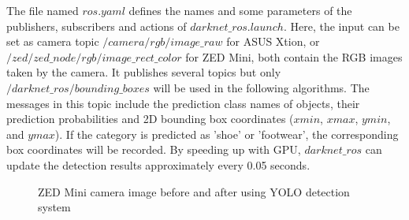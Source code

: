 The file named $ros.yaml$ defines the names and some parameters of the publishers, subscribers and actions of $darknet\_ros.launch$. Here, the input can be set as camera topic $/camera/rgb/image\_raw$ for ASUS Xtion, or $/zed\slash zed\_node\slash rgb\slash image\_rect\_color$ for ZED Mini, both contain the RGB images taken by the camera. It publishes several topics but only $/darknet\_ros/bounding\_boxes$ will be used in the following algorithms. The messages in this topic include the prediction class names of objects, their prediction probabilities and 2D bounding box coordinates ($xmin$, $xmax$, $ymin$, and $ymax$). If the category is predicted as 'shoe' or 'footwear', the corresponding box coordinates will be recorded. By speeding up with GPU, $darknet\_ros$ can update the detection results approximately every 0.05 seconds.

\begin{figure}[H]
\centering
{}
\caption{ZED Mini camera image before and after using YOLO detection system}
\label{5.2zed}
\end{figure}

